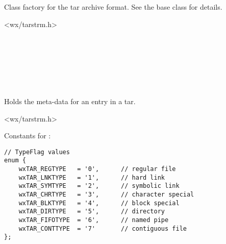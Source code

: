 %
%

\section{}\label{wxtarclassfactory}

Class factory for the tar archive format. See the base class
for details.




<wx/tarstrm.h>


\\
\\
\\
\\


%
%

\section{}\label{wxtarentry}

Holds the meta-data for an entry in a tar.




<wx/tarstrm.h>


Constants for :

\begin{verbatim}
// TypeFlag values
enum {
    wxTAR_REGTYPE   = '0',      // regular file
    wxTAR_LNKTYPE   = '1',      // hard link
    wxTAR_SYMTYPE   = '2',      // symbolic link
    wxTAR_CHRTYPE   = '3',      // character special
    wxTAR_BLKTYPE   = '4',      // block special
    wxTAR_DIRTYPE   = '5',      // directory
    wxTAR_FIFOTYPE  = '6',      // named pipe
    wxTAR_CONTTYPE  = '7'       // contiguous file
};

\end{verbatim}

